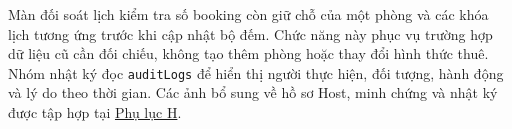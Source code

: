Màn đối soát lịch kiểm tra số booking còn giữ chỗ của một phòng và các khóa lịch tương ứng trước khi cập nhật bộ đếm. Chức năng này phục vụ trường hợp dữ liệu cũ cần đối chiếu, không tạo thêm phòng hoặc thay đổi hình thức thuê. Nhóm nhật ký đọc \texttt{auditLogs} để hiển thị người thực hiện, đối tượng, hành động và lý do theo thời gian. Các ảnh bổ sung về hồ sơ Host, minh chứng và nhật ký được tập hợp tại \hyperref[sec:admin-additional-screens]{Phụ lục H}.
